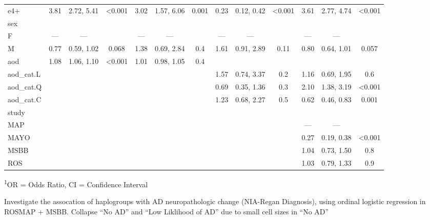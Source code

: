 \documentclass[]{book}
\begin{document}
\begin{longtable}{lcccccccccccc}
e4+ & 3.81 & 2.72, 5.41 & <0.001 & 3.02 & 1.57, 6.06 & 0.001 & 0.23 & 0.12, 0.42 & <0.001 & 3.61 & 2.77, 4.74 & <0.001 \\ 
sex &  &  &  &  &  &  &  &  &  &  &  &  \\ 
F & --- & --- &  & --- & --- &  & --- & --- &  & --- & --- &  \\ 
M & 0.77 & 0.59, 1.02 & 0.068 & 1.38 & 0.69, 2.84 & 0.4 & 1.61 & 0.91, 2.89 & 0.11 & 0.80 & 0.64, 1.01 & 0.057 \\ 
aod & 1.08 & 1.06, 1.10 & <0.001 & 1.01 & 0.98, 1.05 & 0.4 &  &  &  &  &  &  \\ 
aod\_cat.L &  &  &  &  &  &  & 1.57 & 0.74, 3.37 & 0.2 & 1.16 & 0.69, 1.95 & 0.6 \\ 
aod\_cat.Q &  &  &  &  &  &  & 0.69 & 0.35, 1.36 & 0.3 & 2.10 & 1.38, 3.19 & <0.001 \\ 
aod\_cat.C &  &  &  &  &  &  & 1.23 & 0.68, 2.27 & 0.5 & 0.62 & 0.46, 0.83 & 0.001 \\ 
study &  &  &  &  &  &  &  &  &  &  &  &  \\ 
MAP &  &  &  &  &  &  &  &  &  & --- & --- &  \\ 
MAYO &  &  &  &  &  &  &  &  &  & 0.27 & 0.19, 0.38 & <0.001 \\ 
MSBB &  &  &  &  &  &  &  &  &  & 1.04 & 0.73, 1.50 & 0.8 \\ 
ROS &  &  &  &  &  &  &  &  &  & 1.03 & 0.79, 1.33 & 0.9 \\ 
\bottomrule
\end{longtable}
\vspace{-5mm}
\begin{minipage}{\linewidth}
\textsuperscript{1}OR = Odds Ratio, CI = Confidence Interval \\ 
\end{minipage}

Investigate the assocation of haplogroups with AD neuropathologic change (NIA-Regan Diagnosis), using ordinal logistic regression in ROSMAP + MSBB. Collapse ``No AD'' and ``Low Liklihood of AD'' due to small cell sizes in ``No AD''
\end{document}
